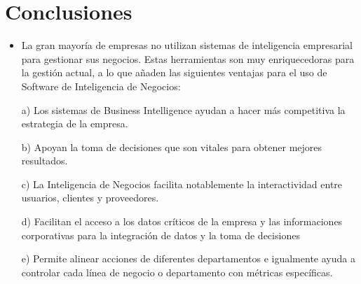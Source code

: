 \documentclass[%
 reprint,
 amsmath,amssymb,
 aps,
]{revtex4-1}
\begin{document}
\section{Conclusiones}\label{sec:4}
\begin{itemize}
\item La  gran mayoría de empresas no utilizan sistemas de inteligencia empresarial para gestionar sus negocios. Estas herramientas son muy enriquecedoras para la gestión actual, a lo que añaden las siguientes ventajas para el  uso de Software de Inteligencia de Negocios:

 a)  Los sistemas de Business Intelligence ayudan a hacer más competitiva la estrategia de la empresa.

 b)  Apoyan la toma de decisiones que son vitales para obtener mejores resultados.

 c)   La Inteligencia de Negocios facilita notablemente la interactividad entre usuarios, clientes y proveedores.

 d)   Facilitan el acceso a los datos críticos de la empresa y las informaciones corporativas para la integración de datos y la toma de decisiones

 e)  Permite alinear acciones de diferentes departamentos e igualmente ayuda a controlar cada línea de negocio o departamento con métricas específicas.
 \\
\end{itemize} 


\end{document}
